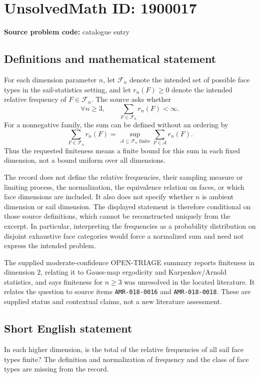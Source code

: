 \documentclass[11pt]{article}
\begin{document}
\section*{UnsolvedMath ID: 1900017}
\textbf{Source problem code:} catalogue entry
\subsection{Definitions and mathematical statement}
For each dimension parameter \(n\), let \(\mathcal F_n\) denote the intended set of possible face types in the sail-statistics setting, and let \(r_n(F)\ge0\) denote the intended relative frequency of \(F\in\mathcal F_n\). The source asks whether
\[
\forall n\ge3,\qquad
\sum_{F\in\mathcal F_n}r_n(F)<\infty.
\]
For a nonnegative family, the sum can be defined without an ordering by
\[
\sum_{F\in\mathcal F_n}r_n(F)
=\sup_{\mathcal A\subseteq\mathcal F_n\text{ finite}}
\sum_{F\in\mathcal A}r_n(F).
\]
Thus the requested finiteness means a finite bound for this sum in each fixed dimension, not a bound uniform over all dimensions.

The record does not define the relative frequencies, their sampling measure or limiting process, the normalization, the equivalence relation on faces, or which face dimensions are included. It also does not specify whether \(n\) is ambient dimension or sail dimension. The displayed statement is therefore conditional on those source definitions, which cannot be reconstructed uniquely from the excerpt. In particular, interpreting the frequencies as a probability distribution on disjoint exhaustive face categories would force a normalized sum and need not express the intended problem.

The supplied moderate-confidence OPEN-TRIAGE summary reports finiteness in dimension \(2\), relating it to Gauss-map ergodicity and Karpenkov/Arnold statistics, and says finiteness for \(n\ge3\) was unresolved in the located literature. It relates the question to source items \texttt{AMR-018-0016} and \texttt{AMR-018-0018}. These are supplied status and contextual claims, not a new literature assessment.
\subsection{Short English statement}
In each higher dimension, is the total of the relative frequencies of all sail face types finite? The definition and normalization of frequency and the class of face types are missing from the record.
\end{document}
